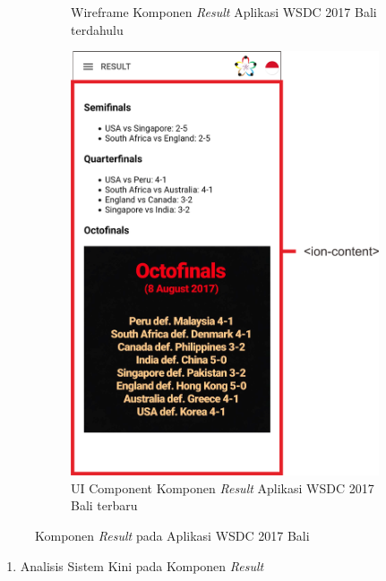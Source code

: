 \begin{enumerate}
\begin{figure}[H]
\begin{subfigure}[b]{0.43\textwidth}
         	\caption{Wireframe Komponen \textit{Result} Aplikasi WSDC 2017 Bali terdahulu}
         	\label{fig:ResultPageWireframe}
     	\end{subfigure}
     	\hspace*{0.5in}
     	\begin{subfigure}[b]{0.43\textwidth}
         	\centering
         	\includegraphics[scale=0.4]{Gambar/ResultPageKini.png}
         	\caption{UI Component Komponen \textit{Result} Aplikasi WSDC 2017 Bali terbaru}
         	\label{fig:ResultPageKini}
     	\end{subfigure}
        \caption{Komponen \textit{Result} pada Aplikasi WSDC 2017 Bali}
        \label{fig:UIComponent1}
	\end{figure}
	\begin{enumerate}
		\item Analisis Sistem Kini pada Komponen \textit{Result} \\

\end{enumerate}
\end{enumerate}
